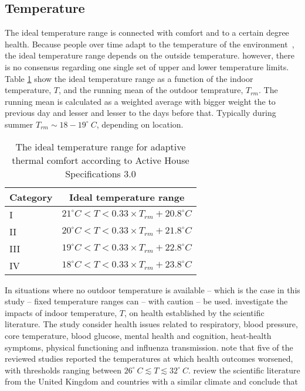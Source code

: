 \documentclass[fleqn,usenatbib,nofootinbib]{revtex4-2}
\begin{document}
	\subsection{Temperature}
	The ideal temperature range is connected with comfort and to a certain degree health. Because people over time adapt to the temperature of the environment~\citep{Humphreys1998}, the ideal temperature range depends on the outside temperature. however, there is no consensus regarding one single set of upper and lower temperature limits. Table \ref{tab:temperature} show the ideal temperature range as a function of the indoor temperature, $T$, and the running mean of the outdoor temprature, $T_{rm}$. The running mean is calculated as a weighted average with bigger weight the to previous day and lesser and lesser to the days before that. Typically during summer $T_{rm}\sim18-19 ^\circ \ C$, depending on location.
		\begin{table}[H]
		\centering
		\caption{The ideal temperature range for adaptive thermal comfort according to Active House Specifications 3.0}
		\label{tab:temperature}
		\begin{tabular}{lc}
			\hline
			Category & Ideal temperature range \\
			\hline
			\hline
			I & $21 ^\circ C <T < 0.33 \times T_{rm} + 20.8 ^\circ C$  \\
			II & $20 ^\circ C < T < 0.33 \times T_{rm} + 21.8 ^\circ C$  \\
			III & $19 ^\circ C < T < 0.33 \times T_{rm} + 22.8 ^\circ C$ \\
			IV & $18 ^\circ C < T < 0.33 \times T_{rm} + 23.8 ^\circ C$ \\
			
			\hline
		\end{tabular}
	\end{table}
	In situations where no outdoor temperature is available -- which is the case in this study -- fixed temperature ranges can -- with caution -- be used.\newline \citet{Tham2019} investigate the impacts of indoor temperature, $T$, on health established by the scientific literature. The study consider health issues related to respiratory, blood pressure, core temperature, blood glucose, mental health and cognition, heat-health symptoms, physical functioning and influenza transmission. \citet{Tham2019} note that five of the reviewed studies reported the temperatures at which health outcomes worsened, with thresholds ranging between $26^\circ \ C\lesssim T \lesssim 32 ^\circ \ C$. \newline 
	\citet{Jevons2016} review the scientific literature from the United Kingdom and countries with a similar climate and conclude that\newline 
	
\end{document}
